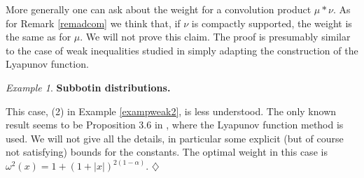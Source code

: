 \documentclass[11pt,reqno]{amsart}
\numberwithin{equation}{section}
\theoremstyle{definition}
\theoremstyle{remark}
\newtheorem{example}[theorem]{Example}
\begin{document}
More generally one can ask about the weight for a convolution product $\mu*\nu$. As for Remark \ref{remadcom} we think that, if $\nu$ is compactly supported, the weight is the same as for $\mu$. We will not prove this claim. The proof is presumably similar to the case of weak inequalities studied in \cite{weakconvol} simply adapting the construction of the Lyapunov function.



\begin{example}\label{exwPsubbotin}
 \textbf{Subbotin distributions.}  

This case, (2) in Example \ref{exampweak2}, is less understood. The only known result seems to be Proposition 3.6 in \cite{CGGR}, where the Lyapunov function method is used. We will not give all the details, in particular some explicit (but of course not satisfying) bounds for the constants. The optimal weight in this case is $\omega^2(x)=1+(1+|x|)^{2(1-\alpha)}$.
\hfill $\diamondsuit$
\end{example}
\end{document}

